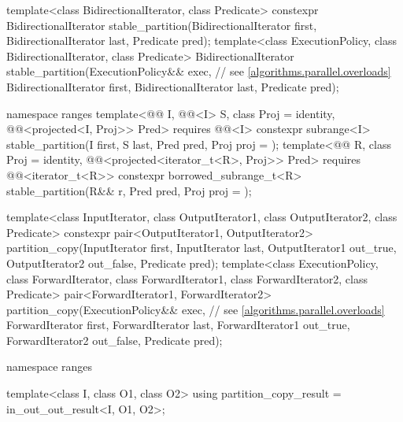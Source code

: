 \begin{codeblock}
{  template<class BidirectionalIterator, class Predicate>
    constexpr BidirectionalIterator stable_partition(BidirectionalIterator first,
                                                     BidirectionalIterator last,
                                                     Predicate pred);
  template<class ExecutionPolicy, class BidirectionalIterator, class Predicate>
    BidirectionalIterator stable_partition(ExecutionPolicy&& exec,  // see \ref{algorithms.parallel.overloads}
                                           BidirectionalIterator first,
                                           BidirectionalIterator last,
                                           Predicate pred);

  namespace ranges {
    template<@@ I, @@<I> S, class Proj = identity,
             @@<projected<I, Proj>> Pred>
      requires @@<I>
      constexpr subrange<I> stable_partition(I first, S last, Pred pred, Proj proj = {});
    template<@@ R, class Proj = identity,
             @@<projected<iterator_t<R>, Proj>> Pred>
      requires @@<iterator_t<R>>
      constexpr borrowed_subrange_t<R> stable_partition(R&& r, Pred pred, Proj proj = {});
  }

  template<class InputIterator, class OutputIterator1,
           class OutputIterator2, class Predicate>
    constexpr pair<OutputIterator1, OutputIterator2>
      partition_copy(InputIterator first, InputIterator last,
                     OutputIterator1 out_true, OutputIterator2 out_false,
                     Predicate pred);
  template<class ExecutionPolicy, class ForwardIterator, class ForwardIterator1,
           class ForwardIterator2, class Predicate>
    pair<ForwardIterator1, ForwardIterator2>
      partition_copy(ExecutionPolicy&& exec,                    // see \ref{algorithms.parallel.overloads}
                     ForwardIterator first, ForwardIterator last,
                     ForwardIterator1 out_true, ForwardIterator2 out_false,
                     Predicate pred);

  namespace ranges {
    template<class I, class O1, class O2>
      using partition_copy_result = in_out_out_result<I, O1, O2>;

}}
\end{codeblock}
